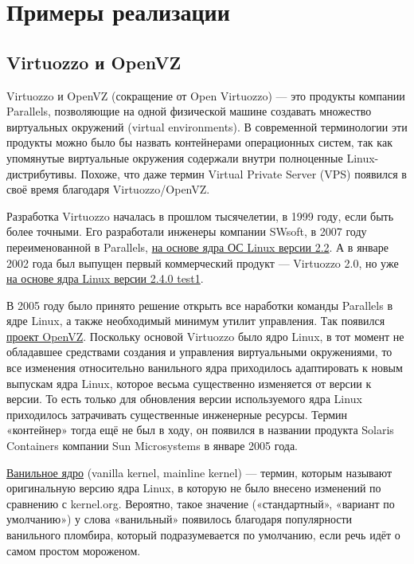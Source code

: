 \documentclass[14pt, a4paper]{article}
\begin{document}
\section*{Примеры реализации}

\subsection*{Virtuozzo и OpenVZ}

Virtuozzo и OpenVZ (сокращение от Open Virtuozzo) — это продукты компании Parallels, позволяющие
на одной физической машине создавать множество виртуальных окружений (virtual environments). В
современной терминологии эти продукты можно было бы назвать контейнерами операционных
систем, так как упомянутые виртуальные окружения содержали внутри полноценные
Linux-дистрибутивы. Похоже, что даже термин Virtual Private Server (VPS) появился в своё время
благодаря Virtuozzo/OpenVZ.

Разработка Virtuozzo началась в прошлом тысячелетии, в 1999 году, если быть более точными. Его
разработали инженеры компании SWsoft, в 2007 году переименованной в Parallels, \href{https://openvz.livejournal.com/49158.html}{на основе ядра ОС
Linux версии 2.2}. А в январе 2002 года был выпущен первый коммерческий продукт — Virtuozzo 2.0, но
уже \href{https://cdn.kernel.org/pub/linux/kernel/v2.4/old-test-kernels/linux-2.4.0-test1.tar.gz}{на основе ядра Linux версии 2.4.0 test1}.

В 2005 году было принято решение открыть все наработки команды Parallels в ядре Linux, а также
необходимый минимум утилит управления. Так появился \href{https://www.linux.com/news/swsoft-offers-free-open-source-version-virtuozzo/}{проект OpenVZ}. Поскольку основой Virtuozzo
было ядро Linux, в тот момент не обладавшее средствами создания и управления виртуальными
окружениями, то все изменения относительно ванильного ядра приходилось адаптировать к новым
выпускам ядра Linux, которое весьма существенно изменяется от версии к версии. То есть только для
обновления версии используемого ядра Linux приходилось затрачивать существенные инженерные
ресурсы. Термин «контейнер» тогда ещё не был в ходу, он появился в названии продукта Solaris
Containers компании Sun Microsystems в январе 2005 года.

\href{https://ru.wikipedia.org/wiki/Âàíèëüíîå_ÿäðî}{Ванильное ядро} (vanilla kernel, mainline kernel) — термин, которым называют оригинальную версию
ядра Linux, в которую не было внесено изменений по сравнению с kernel.org. Вероятно, такое
значение («стандартный», «вариант по умолчанию») у слова «ванильный» появилось благодаря
популярности ванильного пломбира, который подразумевается по умолчанию, если речь идёт о самом
простом мороженом.
\end{document}
